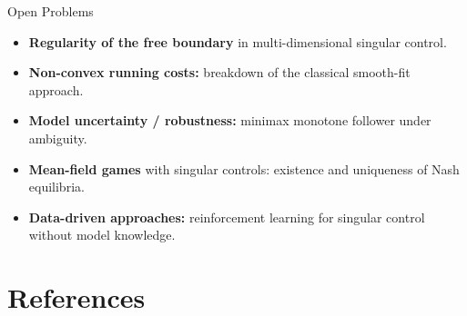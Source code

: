 \documentclass[11pt, aspectratio=169]{beamer}
\theoremstyle{plain}
\begin{document}
\begin{frame}{Open Problems}
  \begin{itemize}
    \item \textbf{Regularity of the free boundary} in multi-dimensional
          singular control.
    \item \textbf{Non-convex running costs:} breakdown of the classical
          smooth-fit approach.
    \item \textbf{Model uncertainty / robustness:}
          minimax monotone follower under ambiguity.
    \item \textbf{Mean-field games} with singular controls:
          existence and uniqueness of Nash equilibria.
    \item \textbf{Data-driven approaches:} reinforcement learning for
          singular control without model knowledge.
  \end{itemize}
\end{frame}

\section*{References}
\end{document}
